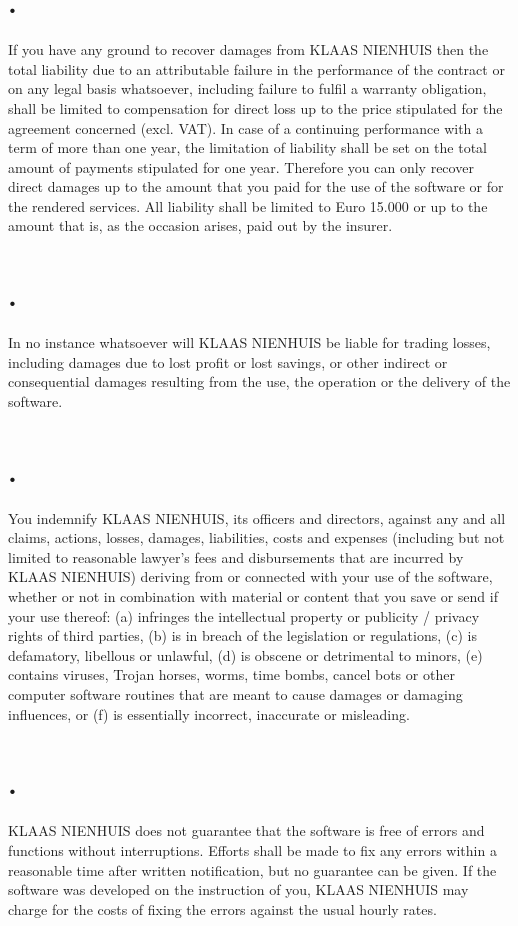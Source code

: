 \documentclass[letterpaper,10pt,english]{sphinxmanual}
\begin{document}
\section{.}
\label{Liability:id1}
If you have any ground to recover damages from KLAAS NIENHUIS then the total liability due to an attributable failure in the performance of the contract or on any legal basis whatsoever, including failure to fulfil a warranty obligation, shall be limited to compensation for direct loss up to the price stipulated for the agreement concerned (excl. VAT). In case of a continuing performance with a term of more than one year, the limitation of liability shall be set on the total amount of payments stipulated for one year. Therefore you can only recover direct damages up to the amount that you paid for the use of the software or for the rendered services. All liability shall be limited to Euro 15.000 or up to the amount that is, as the occasion arises, paid out by the insurer.


\section{.}
\label{Liability:id2}
In no instance whatsoever will KLAAS NIENHUIS be liable for trading losses, including damages due to lost profit or lost savings, or other indirect or consequential damages resulting from the use, the operation or the delivery of the software.


\section{.}
\label{Liability:id3}
You indemnify KLAAS NIENHUIS, its officers and directors, against any and all claims, actions, losses, damages, liabilities, costs and expenses (including but not limited to reasonable lawyer’s fees and disbursements that are incurred by KLAAS NIENHUIS) deriving from or connected with your use of the software, whether or not in combination with material or content that you save or send if your use thereof: (a) infringes the intellectual property or publicity / privacy rights of third parties, (b) is in breach of the legislation or regulations, (c) is defamatory, libellous or unlawful, (d) is obscene or detrimental to minors, (e) contains viruses, Trojan horses, worms, time bombs, cancel bots or other computer software routines that are meant to cause damages or damaging influences, or (f) is essentially incorrect, inaccurate or misleading.


\section{.}
\label{Liability:id4}
KLAAS NIENHUIS does not guarantee that the software is free of errors and functions without interruptions. Efforts shall be made to fix any errors within a reasonable time after written notification, but no guarantee can be given. If the software was developed on the instruction of you, KLAAS NIENHUIS may charge for the costs of fixing the errors against the usual hourly rates.
\end{document}
